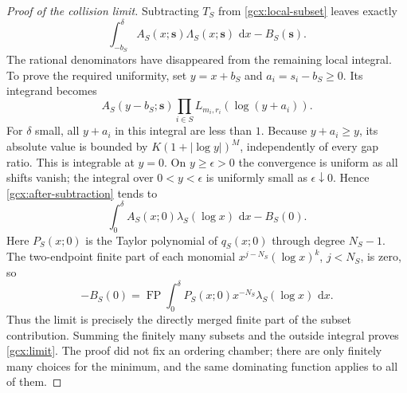 \documentclass[11pt]{article}
\numberwithin{equation}{section}
\theoremstyle{plain}
\theoremstyle{definition}
\theoremstyle{remark}
\DeclareMathOperator{\FP}{FP}
\newcommand{\dd}{\,\mathrm d}
\begin{document}
\begin{proof}[Proof of the collision limit]
Subtracting $T_S$ from \eqref{gcx:local-subset} leaves exactly
\begin{equation}\label{gcx:after-subtraction}
 \int_{-b_S}^{\delta}A_S(x;\boldsymbol s)
                \Lambda_S(x;\boldsymbol s)\,\dd x-B_S(\boldsymbol s).
\end{equation}
The rational denominators have disappeared from the remaining local
integral.  To prove the required uniformity, set $y=x+b_S$ and
$a_i=s_i-b_S\ge0$.  Its integrand becomes
\[
 A_S(y-b_S;\boldsymbol s)
       \prod_{i\in S}L_{m_i,r_i}(\log(y+a_i)).
\]
For $\delta$ small, all $y+a_i$ in this integral are less than $1$.
Because $y+a_i\ge y$, its absolute value is bounded by
$K(1+|\log y|)^M$, independently of every gap ratio.  This is integrable
at $y=0$.  On $y\ge\epsilon>0$ the convergence is uniform as all shifts
vanish; the integral over $0<y<\epsilon$ is uniformly small as
$\epsilon\downarrow0$.  Hence \eqref{gcx:after-subtraction} tends to
\[
 \int_0^\delta A_S(x;0)\lambda_S(\log x)\,\dd x-B_S(0).
\]
Here $P_S(x;0)$ is the Taylor polynomial of $q_S(x;0)$ through degree
$N_S-1$.  The two-endpoint finite part of each monomial
$x^{j-N_S}(\log x)^k$, $j<N_S$, is zero, so
\[
 -B_S(0)=\FP\int_0^\delta
          P_S(x;0)x^{-N_S}\lambda_S(\log x)\,\dd x.
\]
Thus the limit is precisely the directly merged finite part of the
subset contribution.  Summing the finitely many subsets and the outside
integral proves \eqref{gcx:limit}.  The proof did not fix an ordering
chamber; there are only finitely many choices for the minimum, and the
same dominating function applies to all of them.
\end{proof}
\end{document}

